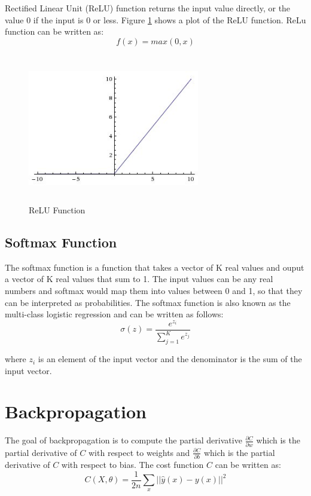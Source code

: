 Rectified Linear Unit (ReLU) function returns the input value directly, or the value 0 if the input is 0 or less. Figure \ref{fig:relu} shows a plot of the ReLU function. ReLu function can be written as:
\begin{equation}
    f(x) = max(0,x)
\end{equation}

\begin{figure}[ht]
\includegraphics[width=7.5cm, height=6.5cm]{images/relu.jpeg}
\centering
\caption{ReLU Function}
\label{fig:relu}
\end{figure}
\FloatBarrier

\subsection{Softmax Function}

The softmax function is a function that takes a vector of K real values and ouput a vector of K real values that sum to 1. The input values can be any real numbers and softmax would map them into values between 0 and 1, so that they can be interpreted as probabilities. The softmax function is also known as the multi-class logistic regression and can be written as follows:
\begin{equation}
    \sigma(z) = \frac{e^{z_i}}{\sum_{j=1}^K e^{z_j}}
\end{equation}

where $z_i$ is an element of the input vector and the denominator is the sum of the input vector.

\section{Backpropagation}

The goal of backpropagation is to compute the partial derivative $\frac{\partial C}{\partial w}$ which is the partial derivative of $C$ with respect to weights and $\frac{\partial C}{\partial b}$ which is the partial derivative of $C$ with respect to bias. The cost function $C$ can be written as:
\begin{equation}
    C(X,\theta) = \frac{1}{2n} \sum_x ||\hat{y}(x) - y(x)||^2 
\end{equation}


